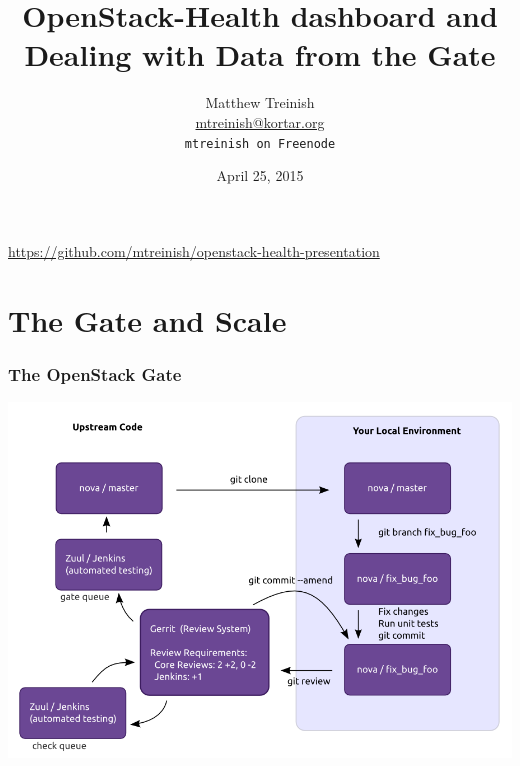 \documentclass[aspectratio=169,11pt,hyperref={colorlinks=true}]{beamer}
\author[Matthew Treinish]{%
    \texorpdfstring{%
        \centering
        Matthew Treinish\\
        \href{mailto:mtreinish@kortar.org}{mtreinish@kortar.org}\\
        \texttt{mtreinish on Freenode}
   }
   {Matthew Treinish}
}
\date{April 25, 2015}
\title[OpenStack-Health dashboard and Dealing with Data from the Gate
\hspace{2em}\insertframenumber/\inserttotalframenumber]{OpenStack-Health dashboard and Dealing with Data from the Gate}
\begin{document}
{%
\begin{frame}[noframenumbering]
    \hypersetup{colorlinks,urlcolor=white}
    \titlepage{}
    \centering
    \href{https://github.com/mtreinish/openstack-health-presentation}{https://github.com/mtreinish/openstack-health-presentation}
\end{frame}
}

\section{The Gate and Scale}
\begin{frame}
    \frametitle{The OpenStack Gate}
	\begin{center}
		\includegraphics[width=.65\textwidth]{code_review.png}
	\end{center}
\end{frame}
\end{document}

